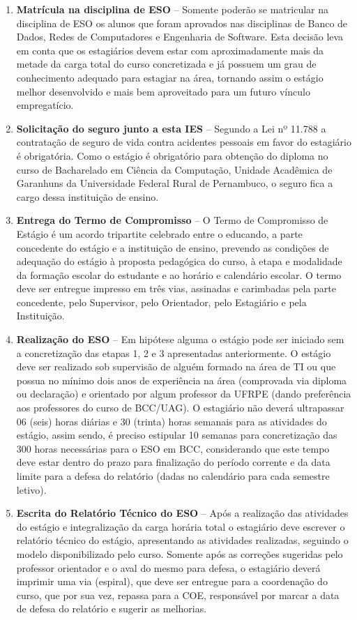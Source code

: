\documentclass[
	12pt,				%
	openright,			%
  oneside,     %
	a4paper,			%
	chapter=TITLE,		%
	english,			%
	french,				%
	spanish,			%
	brazil				%
	]{abntex2}
\begin{document}
\begin{enumerate}
    \item \textbf{Matrícula na disciplina de ESO} – Somente poderão se matricular na disciplina de ESO os alunos que foram aprovados nas disciplinas de Banco de Dados, Redes de Computadores e Engenharia de Software. Esta decisão leva em conta que os estagiários devem estar com aproximadamente mais da metade da carga total do curso concretizada e já possuem um grau de conhecimento adequado para estagiar na área, tornando assim o estágio melhor desenvolvido e mais bem aproveitado para um futuro vínculo empregatício.
    \item \textbf{Solicitação do seguro junto a esta IES} – Segundo a Lei nº 11.788 a contratação de seguro de vida contra acidentes pessoais em favor do estagiário é obrigatória. Como o estágio é obrigatório para obtenção do diploma no curso de Bacharelado em Ciência da Computação, Unidade Acadêmica de Garanhuns da Universidade Federal Rural de Pernambuco, o seguro fica a cargo dessa instituição de ensino.
    \item \textbf{Entrega do Termo de Compromisso} – O Termo de Compromisso de Estágio é um acordo tripartite celebrado entre o educando, a parte concedente do estágio e a instituição de ensino, prevendo as condições de adequação do estágio à proposta pedagógica do  curso, à etapa e modalidade da formação escolar  do  estudante  e ao horário e calendário escolar. O termo deve ser entregue impresso em três vias, assinadas e carimbadas pela parte concedente, pelo  Supervisor,  pelo  Orientador, pelo Estagiário e pela Instituição.
    \item \textbf{Realização do ESO} – Em hipótese alguma o estágio pode ser iniciado sem a concretização das etapas 1, 2 e 3 apresentadas anteriormente. O estágio deve ser realizado sob supervisão de alguém formado na área de TI ou que possua no mínimo dois anos de experiência na área (comprovada via diploma ou declaração) e orientado por algum professor da UFRPE (dando preferência aos professores do curso de BCC/UAG). O estagiário não deverá ultrapassar 06 (seis) horas diárias e 30 (trinta) horas semanais para as atividades do estágio, assim sendo, é preciso estipular 10 semanas para concretização das 300 horas necessárias para o ESO em BCC, considerando que este tempo deve estar dentro do prazo para finalização do período corrente e da data limite para a defesa do relatório (dadas no calendário para cada semestre letivo).
    \item \textbf{Escrita do Relatório Técnico do ESO} – Após a realização das atividades do estágio e integralização da carga horária total o estagiário deve escrever o relatório técnico do estágio, apresentando as atividades realizadas, seguindo o modelo disponibilizado pelo curso. Somente após as correções sugeridas pelo professor orientador e o aval do mesmo para defesa, o estagiário deverá imprimir uma via (espiral), que deve ser entregue para a coordenação do curso, que por sua vez, repassa para a COE, responsável por marcar a data de defesa do relatório e sugerir as melhorias.

\end{enumerate}
\end{document}
